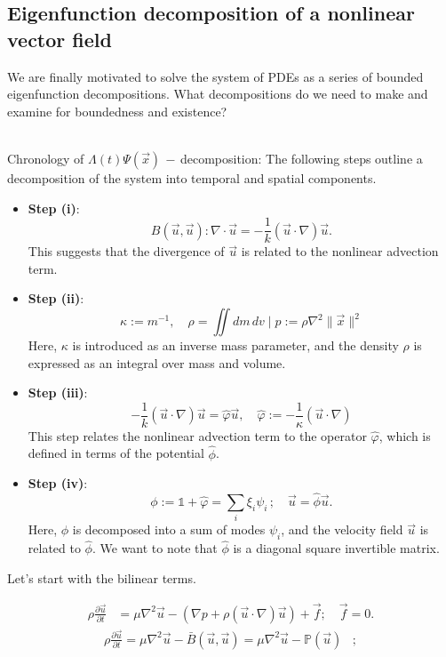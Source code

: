 \documentclass[12pt]{article}
\begin{document}
\subsection{Eigenfunction decomposition of a nonlinear vector field}
We are finally motivated to solve the system of PDEs as a series of bounded eigenfunction decompositions. What decompositions do we need to make and examine for boundedness and existence?\\\

Chronology of \(\Lambda(t) \Psi{(\vec x)} \,-\, \)decomposition:
The following steps outline a decomposition of the system into temporal and spatial components.

\begin{itemize}
    \item \textbf{Step (i)}:
    \[
    B(\vec{u}, \vec{u}): \nabla \cdot \vec{u} = -\frac{1}{k} (\vec{u} \cdot \nabla) \vec{u}.
    \]
    This suggests that the divergence of \(\vec{u}\) is related to the nonlinear advection term.

    \item \textbf{Step (ii)}:
    \[
    \kappa := m^{-1}, \quad \rho = \iint dm \, dv \;|\; p := \rho \nabla^{2} \|\vec x\|^{2}
    \]
    Here, \(\kappa\) is introduced as an inverse mass parameter, and the density \(\rho\) is expressed as an integral over mass and volume.

    \item \textbf{Step (iii)}:
    \[
    - \frac{1}{k} (\vec{u} \cdot \nabla) \vec{u} = \hat{\varphi} \vec{u}, \quad \hat{\varphi} := - \frac{1}{\kappa} (\vec u \cdot \nabla)
    \]
    This step relates the nonlinear advection term to the operator \(\hat{\varphi}\), which is defined in terms of the potential \(\hat{\phi}\).

    \item \textbf{Step (iv)}:
    \[
    \phi := \mathbb{1} + \hat \varphi = \sum_{i} \xi_{i} \psi_{i}\, ; \quad \vec{u} = \hat{\phi}\vec u.
    \]
    Here, \(\phi\) is decomposed into a sum of modes \(\psi_i\), and the velocity field \(\vec{u}\) is related to \(\hat{\phi}\). We want to note that $\hat \phi$ is a diagonal square invertible matrix. 
\end{itemize}

Let's start with the bilinear terms. 

\begin{align*}
\rho \frac{\partial \vec{u}}{\partial t} &= \mu \nabla^2 \vec{u} - (\nabla p + \rho (\vec{u} \cdot \nabla) \vec{u}) + \vec{f}; \quad \vec{f} = 0.
\end{align*}
\begin{align*}
\rho \frac{\partial \vec{u}}{\partial t} = \mu \nabla^2 \vec{u} - \bar B(\vec{u}, \vec{u}) = \mu \nabla^2 \vec{u} - \mathbb{P}(\vec{u}) \;\;\;;
\end{align*}
\end{document}
